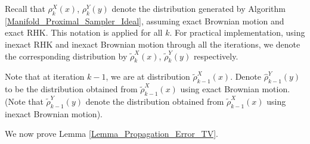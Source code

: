 Recall that $\rho_{k}^{X}(x)$, $\rho_{k}^{Y}(y)$ denote the distribution generated by Algorithm \ref{Manifold_Proximal_Sampler_Ideal}, 
assuming exact Brownian motion and exact RHK. This notation is applied for all $k$. 
For practical implementation, using inexact RHK and inexact Brownian motion through all the iterations, 
we denote the corresponding distribution by $\tilde{\rho}_{k}^{X}(x)$, $\tilde{\rho}_{k}^{Y}(y)$ respectively.

Note that at iteration $k-1$, we are at distribution $\tilde{\rho}_{k-1}^{X}(x)$.
Denote $\hat{\rho}_{k-1}^{Y}(y)$ to be the distribution obtained from $\tilde{\rho}_{k-1}^{X}(x)$ using exact Brownian motion. 
(Note that $\tilde{\rho}_{k-1}^{Y}(y)$ denote the distribution obtained from $\tilde{\rho}_{k-1}^{X}(x)$ using inexact Brownian motion).  

We now prove Lemma \ref{Lemma_Propagation_Error_TV}.

